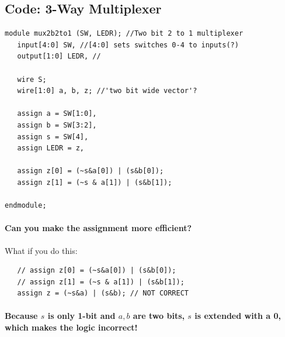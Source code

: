 \documentclass[a4paper,12pt]{report}
\begin{document}
\subsection{Code: 3-Way Multiplexer}


\begin{lstlisting}
module mux2b2to1 (SW, LEDR); //Two bit 2 to 1 multiplexer  
   input[4:0] SW, //[4:0] sets switches 0-4 to inputs(?)
   output[1:0] LEDR, //

   wire S;
   wire[1:0] a, b, z; //'two bit wide vector'?

   assign a = SW[1:0],
   assign b = SW[3:2],
   assign s = SW[4],
   assign LEDR = z,

   assign z[0] = (~s&a[0]) | (s&b[0]);
   assign z[1] = (~s & a[1]) | (s&b[1]);

endmodule;
\end{lstlisting}

\paragraph{Can you make the assignment more efficient?}
What if you do this:
\begin{lstlisting}
   // assign z[0] = (~s&a[0]) | (s&b[0]);
   // assign z[1] = (~s & a[1]) | (s&b[1]);
   assign z = (~s&a) | (s&b); // NOT CORRECT
\end{lstlisting}

\paragraph{Because $s$ is only 1-bit and $a, b$ are two bits, $s$ is extended with a \textbf{0}, 
which makes the logic incorrect!}
\end{document}
